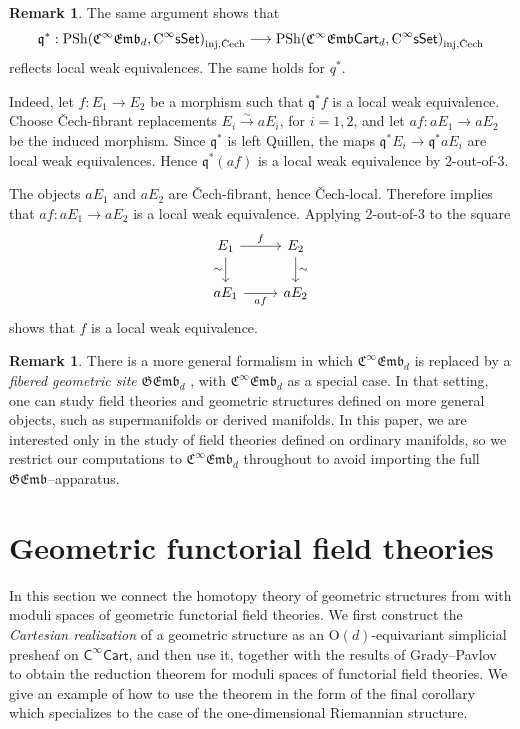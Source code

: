 \documentclass{amsart}
\newcommand{\cat}[1]{\mathsf{#1}}
\newcommand{\sset}{\cat{sSet}}
\newcommand{\inj}{\textnormal{inj}}
\newcommand{\Cech}{\textnormal{\v{C}ech}}
\newcommand{\CsSet}{\textnormal{C}^{\infty}\sset}
\newcommand{\Cart}{\cat{C}^{\infty}\cat{Cart}}
\newcommand{\femb}[1]{\mathfrak{C}^{\infty}\mathfrak{Emb}_{#1}}
\newcommand{\fembcart}[1]{\mathfrak{C}^{\infty}\mathfrak{Emb}\cat{Cart}_{#1}}
\newcommand{\gemb}[1]{\mathfrak{GEmb}_{#1}}
\newcommand{\psh}{\mathrm{PSh}}
\theoremstyle{definition}
\newtheorem{remark}[equation]{Remark}
\numberwithin{equation}{subsection}
\numberwithin{subsubsection}{subsection}
\begin{document}
\begin{remark}\label{rem:qen.reflects.local.weak.equivalences}
  The same argument shows that
  \[
    \mathfrak{q}^{*}:
    \psh(\femb{d},\CsSet)_{\inj,\Cech}
    \longrightarrow
    \psh(\fembcart{d},\CsSet)_{\inj,\Cech}
  \]
  reflects local weak equivalences. The same holds for
  \(q^{*}\).

  Indeed, let \(f:E_{1}\to E_{2}\) be a morphism such that
  \(\mathfrak{q}^{*}f\) is a local weak equivalence. Choose
  \v{C}ech-fibrant replacements \(E_{i}\xrightarrow{\sim}aE_{i}\), for
  \(i=1,2\), and let \(af:aE_{1}\to aE_{2}\) be the induced morphism.
  Since \(\mathfrak{q}^{*}\) is left Quillen, the maps
  \(\mathfrak{q}^{*}E_{i}\to \mathfrak{q}^{*}aE_{i}\) are local
  weak equivalences. Hence \(\mathfrak{q}^{*}(af)\) is a local weak
  equivalence by \(2\)-out-of-\(3\).

  The objects \(aE_{1}\) and \(aE_{2}\) are \v{C}ech-fibrant, hence
  \v{C}ech-local. Therefore 
  implies that \(af:aE_{1}\to aE_{2}\) is a local weak equivalence.
  Applying \(2\)-out-of-\(3\) to the square
  \[
    \begin{tikzcd}
      E_{1} \arrow[r,"f"] \arrow[d,"\sim"']
      & E_{2} \arrow[d,"\sim"] \\
      aE_{1} \arrow[r,"af"']
      & aE_{2}
    \end{tikzcd}
  \]
  shows that \(f\) is a local weak equivalence.
\end{remark}

\begin{remark}\label{rem:GEmb}
  There is a more general formalism in which \( \femb{d} \) is replaced by a
  \emph{fibered geometric site} \( \gemb{d} \)
  \cite[Definition~4.2.5]{GP26}, with
  \( \femb{d} \)
  as a special case. In that setting, one can study field theories
  and geometric
  structures defined on more general objects, such as
  supermanifolds or derived
  manifolds. In this paper, we are interested only in the study of field
  theories defined on ordinary manifolds, so we restrict our
  computations to \( \femb{d} \)
  throughout to avoid importing the full \( \gemb{} \)--apparatus.
\end{remark}

\section{Geometric functorial field theories}\label{sec:geom.fft}

In this section we connect the homotopy theory of geometric structures from
 with moduli spaces of geometric functorial
field theories. We first construct the \emph{Cartesian realization} of a
geometric
structure as an \(\mathrm{O}(d)\)-equivariant simplicial presheaf on
\(\Cart\), and then use it, together with the results of Grady--Pavlov
\cite{GP23,GP26} to obtain the reduction
theorem for moduli spaces of functorial field theories. We give an example of
how to use the theorem in the form of the final corollary which specializes to
the case of the one-dimensional Riemannian structure.
\end{document}
